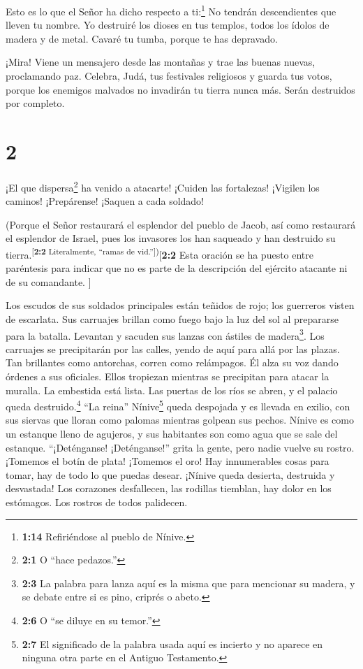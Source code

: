  Esto es lo que el Señor ha dicho respecto a ti:\footnote{\textbf{1:14}
  Refiriéndose al pueblo de Nínive.} No tendrán descendientes que lleven
tu nombre. Yo destruiré los dioses en tus templos, todos los ídolos de
madera y de metal. Cavaré tu tumba, porque te has depravado.

 ¡Mira! Viene un mensajero desde las montañas y trae las
buenas nuevas, proclamando paz. Celebra, Judá, tus festivales religiosos
y guarda tus votos, porque los enemigos malvados no invadirán tu tierra
nunca más. Serán destruidos por completo.

\hypertarget{section-1}{%
\section{2}\label{section-1}}

 ¡El que dispersa\footnote{\textbf{2:1} O ``hace pedazos.''}
ha venido a atacarte! ¡Cuiden las fortalezas! ¡Vigilen los caminos!
¡Prepárense! ¡Saquen a cada soldado!

 (Porque el Señor restaurará el esplendor del pueblo de
Jacob, así como restaurará el esplendor de Israel, pues los invasores
los han saqueado y han destruido su
tierra.\textsuperscript{{[}\textbf{2:2} Literalmente, ``ramas de
vid.''{]})}{[}\textbf{2:2} Esta oración se ha puesto entre paréntesis
para indicar que no es parte de la descripción del ejército atacante ni
de su comandante. {]}

 Los escudos de sus soldados principales están teñidos de
rojo; los guerreros visten de escarlata. Sus carruajes brillan como
fuego bajo la luz del sol al prepararse para la batalla. Levantan y
sacuden sus lanzas con ástiles de madera\footnote{\textbf{2:3} La
  palabra para lanza aquí es la misma que para mencionar su madera, y se
  debate entre si es pino, criprés o abeto.}.  Los carruajes
se precipitarán por las calles, yendo de aquí para allá por las plazas.
Tan brillantes como antorchas, corren como relámpagos.  Él
alza su voz dando órdenes a sus oficiales. Ellos tropiezan mientras se
precipitan para atacar la muralla. La embestida está lista. 
Las puertas de los ríos se abren, y el palacio queda
destruido.\footnote{\textbf{2:6} O ``se diluye en su temor.''}
 ``La reina'' Nínive\footnote{\textbf{2:7} El significado de
  la palabra usada aquí es incierto y no aparece en ninguna otra parte
  en el Antiguo Testamento.} queda despojada y es llevada en exilio, con
sus siervas que lloran como palomas mientras golpean sus pechos.
 Nínive es como un estanque lleno de agujeros, y sus
habitantes son como agua que se sale del estanque. ``¡Deténganse!
¡Deténganse!'' grita la gente, pero nadie vuelve su rostro. 
¡Tomemos el botín de plata! ¡Tomemos el oro! Hay innumerables cosas para
tomar, hay de todo lo que puedas desear.  ¡Nínive queda
desierta, destruida y desvastada! Los corazones desfallecen, las
rodillas tiemblan, hay dolor en los estómagos. Los rostros de todos
palidecen.

